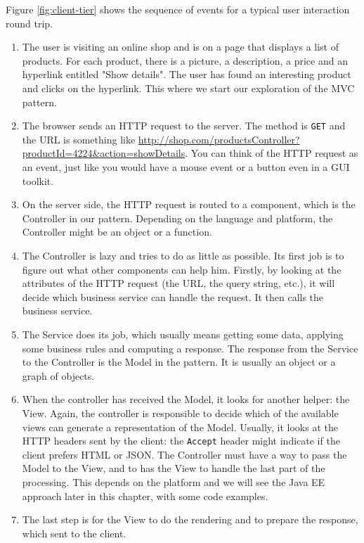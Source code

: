 Figure \ref{fig:client-tier} shows the sequence of events for a typical user interaction round trip.
\begin{enumerate}
\item The user is visiting an online shop and is on a page that displays a list of products. For each product, there is a picture, a description, a price and an hyperlink entitled "Show details". The user has found an interesting product and clicks on the hyperlink. This where we start our exploration of the \ac{MVC} pattern.
\item The browser sends an HTTP request to the server. The method is \texttt{GET} and the URL is something like \url{http://shop.com/productsController?productId=4224&action=showDetails}. You can think of the HTTP request as an event, just like you would have a mouse event or a button even in a GUI toolkit.
\item On the server side, the HTTP request is routed to a component, which is the Controller in our pattern. Depending on the language and platform, the Controller might be an object or a function.
\item The Controller is lazy and tries to do as little as possible. Its first job is to figure out what other components can help him. Firstly, by looking at the attributes of the HTTP request (the URL, the query string, etc.), it will decide which business service can handle the request. It then calls the business service.
\item The Service does its job, which usually means getting some data, applying some business rules and computing a response. The response from the Service to the Controller is the Model in the pattern. It is usually an object or a graph of objects.
\item When the controller has received the Model, it looks for another helper: the View. Again, the controller is responsible to decide which of the available views can generate a representation of the Model. Usually, it looks at the HTTP headers sent by the client: the \texttt{Accept} header might indicate if the client prefers HTML or JSON. The Controller must have a way to pass the Model to the View, and to has the View to handle the last part of the processing. This depends on the platform and we will see the Java EE approach later in this chapter, with some code examples.
\item The last step is for the View to do the rendering and to prepare the response, which sent to the client.
\end{enumerate}

